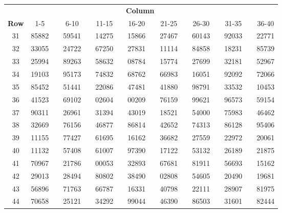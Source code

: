 


\begin{center}
\begin{tabular}{cccc cccc cccc cccc}
& \multicolumn{14}{c}{\textbf{Column}} \\
\cline{2-16}
\textbf{Row} & 1-5 && 6-10 && 11-15 && 16-20 && 21-25 && 26-30 && 31-35 && 36-40 \\
\hline
31 & 85882 & \quad & 59541 & \quad & 14275 & \quad & 15866 & \quad & 27467 & \quad & 60143 & \quad & 92033 & \quad & 22771 \\
32 & 33055 & \quad & 24722 & \quad & 67250 & \quad & 27831 & \quad & 11114 & \quad & 84858 & \quad & 18231 & \quad & 85739 \\
33 & 25994 & \quad & 89263 & \quad & 58632 & \quad & 08784 & \quad & 15774 & \quad & 27699 & \quad & 32181 & \quad & 52967 \\
34 & 19103 & \quad & 95173 & \quad & 74832 & \quad & 68762 & \quad & 66983 & \quad & 16051 & \quad & 92092 & \quad & 72066 \\
35 & 85452 & \quad & 51441 & \quad & 22086 & \quad & 47481 & \quad & 41880 & \quad & 98791 & \quad & 33532 & \quad & 10453 \\
\hline
36 & 41523 & \quad & 69102 & \quad & 02604 & \quad & 00209 & \quad & 76159 & \quad & 99621 & \quad & 96573 & \quad & 59154 \\
37 & 90311 & \quad & 26961 & \quad & 31394 & \quad & 43019 & \quad & 18521 & \quad & 54000 & \quad & 75983 & \quad & 46462 \\
38 & 32669 & \quad & 76156 & \quad & 46877 & \quad & 86814 & \quad & 42652 & \quad & 74313 & \quad & 86128 & \quad & 95406 \\
39 & 11155 & \quad & 77427 & \quad & 61695 & \quad & 16162 & \quad & 36682 & \quad & 27559 & \quad & 22972 & \quad & 20061 \\
40 & 11132 & \quad & 57408 & \quad & 61007 & \quad & 97390 & \quad & 17122 & \quad & 53132 & \quad & 26189 & \quad & 21875 \\
\hline
41 & 70967 & \quad & 21786 & \quad & 00053 & \quad & 32893 & \quad & 67681 & \quad & 81911 & \quad & 56693 & \quad & 15162 \\
42 & 29013 & \quad & 28494 & \quad & 80802 & \quad & 38490 & \quad & 02808 & \quad & 54605 & \quad & 20490 & \quad & 19681 \\
43 & 56896 & \quad & 71763 & \quad & 66787 & \quad & 16331 & \quad & 40798 & \quad & 22111 & \quad & 28907 & \quad & 81975 \\
44 & 70658 & \quad & 25121 & \quad & 34292 & \quad & 99044 & \quad & 46390 & \quad & 86503 & \quad & 31601 & \quad & 82444 \\

\end{tabular}
\end{center}
